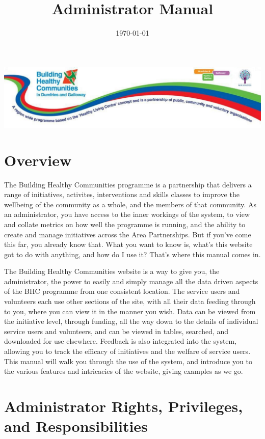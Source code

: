 \documentclass{bhcguides}
\begin{document}
\title{Administrator Manual}
\includegraphics[width=1.0\textwidth]{BHCbanner.png}
\date{\today}
\maketitle

\tableofcontents

\section{Overview}

The Building Healthy Communities programme is a partnership that delivers a range of initiatives, activites, interventions and skills classes to improve the wellbeing of the community as a whole, and the members of that community. As an administrator, you have access to the inner workings of the system, to view and collate metrics on how well the programme is running, and the ability to create and manage initiatives across the Area Partnerships. But if you've come this far, you already know that. What you want to know is, what's this website got to do with anything, and how do I use it? That's where this manual comes in.

The Building Healthy Communities website is a way to give you, the administrator, the power to easily and simply manage all the data driven aspects of the BHC programme from one consistent location. The service users and volunteers each use other sections of the site, with all their data feeding through to you, where you can view it in the manner you wish. Data can be viewed from the initiative level, through funding, all the way down to the details of individual service users and volunteers, and can be viewed in tables, searched, and downloaded for use elsewhere. Feedback is also integrated into the system, allowing you to track the efficacy of initiatives and the welfare of service users. This manual will walk you through the use of the system, and introduce you to the various features and intricacies of the website, giving examples as we go.

\pagebreak

\section{Administrator Rights, Privileges, and Responsibilities}
\label{sec:adminrights}
\end{document}
